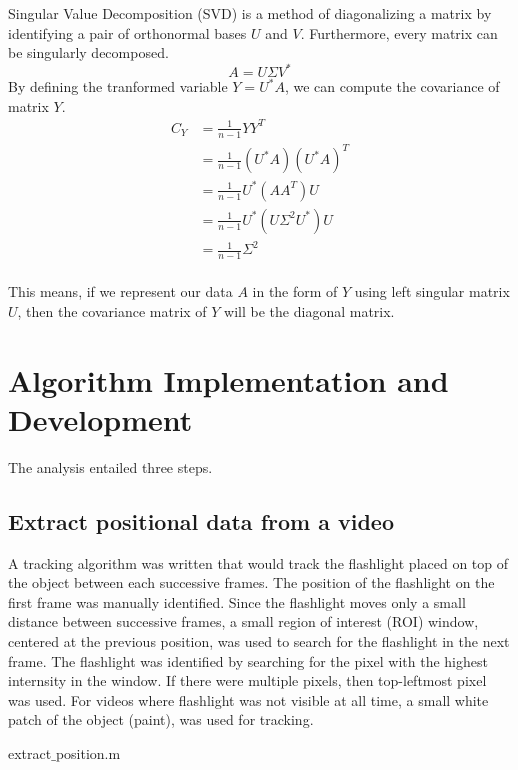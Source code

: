 \documentclass{article}
\begin{document}
Singular Value Decomposition (SVD) is a method of diagonalizing a matrix by identifying a pair of orthonormal bases $U$ and $V$. Furthermore, every matrix can be singularly decomposed.
\[
A = U\Sigma V^*
\]
By defining the tranformed variable $Y = U^*A$, we can compute the covariance of matrix $Y$.
\begin{align*}
C_{{Y}} &= \frac{1}{n-1} {YY}^{T} \\
&= \frac{1}{n-1} ({U}^*{A})({U}^*{A})^{T} \\
&= \frac{1}{n-1} U^*(AA^T)U \\
&= \frac{1}{n-1} U^*(U\Sigma^2 U^*)U \\
&= \frac{1}{n-1} \Sigma^2 \\
\end{align*}

This means, if we represent our data $A$ in the form of $Y$ using left singular matrix $U$, then the covariance matrix of $Y$ will be the diagonal matrix. 


\section{Algorithm Implementation and Development}\label{Algorithm}
The analysis entailed three steps.
\subsection{Extract positional data from a video}
A tracking algorithm was written that would track the flashlight placed on top of the object between each successive frames. The position of the flashlight on the first frame was manually identified. Since the flashlight moves only a small distance between successive frames, a small region of interest (ROI) window, centered at the previous position, was used to search for the flashlight in the next frame. The flashlight was identified by searching for the pixel with the highest internsity in the window. If there were multiple pixels, then top-leftmost pixel was used. For videos where flashlight was not visible at all time, a small white patch of the object (paint), was used for tracking.

\begin{algorithm}\label{alg:position}
\begin{algorithmic}
\ENDFOR
{}
\end{algorithmic}
\caption{extract$\_$position.m}
\end{algorithm}
\end{document}
